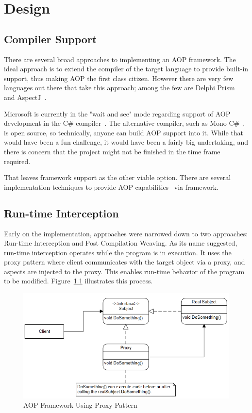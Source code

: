 \chapter{Design}

\section{Compiler Support}

There are several broad approaches to implementing an AOP framework. The ideal approach is to extend the compiler of the target language to provide built-in support, thus making AOP the first class citizen. However there are very few languages out there that take this approach; among the few are Delphi Prism~\cite{delphi_prism2010} and AspectJ~\cite{aspectj_faq, aspectj_text}. 

Microsoft is currently in the "wait and see" mode regarding support of AOP development in the C\# compiler~\cite{hejlsberg}. The alternative compiler, such as Mono C\#~\cite{monocsharp}, is open source, so technically, anyone can build AOP support into it. While that would have been a fun challenge, it would have been a fairly big undertaking, and there is concern that the project might not be finished in the time frame required.

That leaves framework support as the other viable option. There are several implementation techniques to provide AOP capabilities~\cite{aopcs, postsharp, aspectcs} via framework.

\section{Run-time Interception}

Early on the implementation, approaches were narrowed down to two approaches: Run-time Interception and Post Compilation Weaving. As its name suggested, run-time interception operates while the program is in execution. It uses the proxy pattern where client communicates with the target object via a proxy, and aspects are injected to the proxy. This enables run-time behavior of the program to be modified. Figure~\ref{proxy_model} illustrates this process.

\begin{figure}[H]
  \includegraphics[scale=1.0]{Proxy3.PNG}
  \centering
  \caption{AOP Framework Using Proxy Pattern\label{proxy_model}}
\end{figure}

